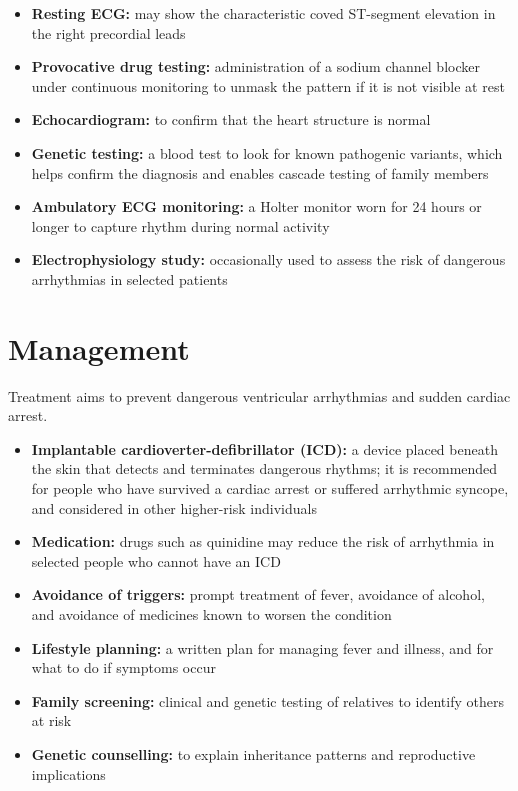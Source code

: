 \begin{itemize}
    \item \textbf{Resting ECG:} may show the characteristic coved ST-segment elevation in the right precordial leads
    \item \textbf{Provocative drug testing:} administration of a sodium channel blocker under continuous monitoring to unmask the pattern if it is not visible at rest
    \item \textbf{Echocardiogram:} to confirm that the heart structure is normal
    \item \textbf{Genetic testing:} a blood test to look for known pathogenic variants, which helps confirm the diagnosis and enables cascade testing of family members
    \item \textbf{Ambulatory ECG monitoring:} a Holter monitor worn for 24 hours or longer to capture rhythm during normal activity
    \item \textbf{Electrophysiology study:} occasionally used to assess the risk of dangerous arrhythmias in selected patients
\end{itemize}

\section*{Management}
Treatment aims to prevent dangerous ventricular arrhythmias and sudden cardiac arrest.

\begin{itemize}
    \item \textbf{Implantable cardioverter-defibrillator (ICD):} a device placed beneath the skin that detects and terminates dangerous rhythms; it is recommended for people who have survived a cardiac arrest or suffered arrhythmic syncope, and considered in other higher-risk individuals
    \item \textbf{Medication:} drugs such as quinidine may reduce the risk of arrhythmia in selected people who cannot have an ICD
    \item \textbf{Avoidance of triggers:} prompt treatment of fever, avoidance of alcohol, and avoidance of medicines known to worsen the condition
    \item \textbf{Lifestyle planning:} a written plan for managing fever and illness, and for what to do if symptoms occur
    \item \textbf{Family screening:} clinical and genetic testing of relatives to identify others at risk
    \item \textbf{Genetic counselling:} to explain inheritance patterns and reproductive implications
\end{itemize}

